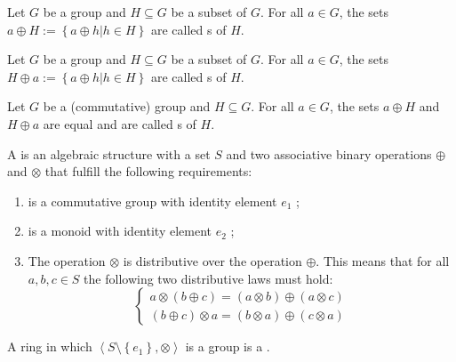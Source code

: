 \begin{defi}
Let $G$ be a group and $H\subseteq G$ be a subset of $G$. For all $a\in G$, the sets $a\oplus H := \left\{a\oplus h | h\in H\right\}$ are called s of $H$.
\cite{Oppliger:2011:CC:2049860}
\end{defi}

\begin{defi}
Let $G$ be a group and $H\subseteq G$ be a subset of $G$. For all $a\in G$, the sets $H\oplus a := \left\{a\oplus h | h\in H\right\}$ are called s of $H$.
\cite{Oppliger:2011:CC:2049860}
\end{defi}

\begin{defi}[Coset]
Let $G$ be a (commutative) group and $H\subseteq G$. For all $a\in G$, the sets $a\oplus H$ and $H\oplus a$ are equal and are called s of $H$.
\cite{Oppliger:2011:CC:2049860}
\end{defi}

\begin{defi}[Ring]
A  is an algebraic structure \soplusotimes with a set $S$ and two associative binary operations $\oplus$ and $\otimes$ that fulfill the following requirements:
\begin{enumerate}
 \item \soplus is a commutative group with identity element $e_1$ ;
 \item \sotimes is a monoid with identity element $e_2$ ;
 \item The operation $\otimes$ is distributive over the operation $\oplus$. This means that for all $a,b,c\in S$ the following two distributive laws must hold:
 \begin{equation}
 \left\{\begin{array}{c}
  a \otimes (b \oplus c)=(a \otimes b) \oplus (a \otimes c)\\
 (b \oplus c) \otimes a=(b \otimes a) \oplus (c \otimes a)
 \end{array}\right.
 \end{equation}
\end{enumerate}
\cite{Oppliger:2011:CC:2049860}
\end{defi}

\begin{defi}[Field]
A ring \soplusotimes in which $\left\langle S\setminus\left\{e_1\right\},\otimes\right\rangle$ is a group is a .
\cite{Oppliger:2011:CC:2049860}
\end{defi}


